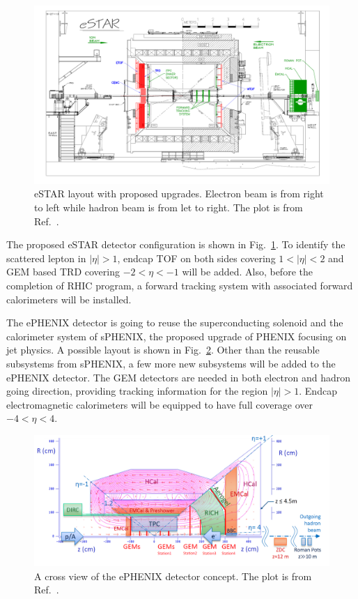 \begin{figure}
\centering
\includegraphics[width=1.0\textwidth]{plots/chpt4/eSTAR_layout.png}
\caption[A layout of the eSTAR detector concept]{
eSTAR layout with proposed upgrades. Electron beam is from right to left while hadron beam is from let to right. The plot is from Ref.~\cite{Abelev:eSTAR}.}
\label{fig:eSTAR_layout}
\end{figure}

The proposed eSTAR detector configuration is shown in
Fig.~\ref{fig:eSTAR_layout}. To identify the scattered lepton in $|\eta|>1$,
endcap TOF on both sides covering $1<|\eta|<2$ and GEM based TRD covering
$-2<\eta<-1$ will be added. Also, before the completion of RHIC program, a
forward tracking system with associated forward calorimeters will be installed.

The ePHENIX detector is going to reuse the superconducting solenoid and the
calorimeter system of sPHENIX, the proposed upgrade of PHENIX focusing on jet
physics. A possible layout is shown in Fig.~\ref{fig:ePhenix_layout}.
Other than the reusable subsystems from sPHENIX, a few more new subsystems will
be added to the ePHENIX detector. The GEM detectors are needed in both electron
and hadron going direction, providing tracking information for the region
$|\eta|>1$. Endcap electromagnetic calorimeters will be equipped to have full
coverage over $-4<\eta<4$.
\begin{figure}
\centering
\includegraphics[width=1.0\textwidth]{plots/chpt4/ePhenix_layout.png}
\caption[A layout of the ePHENIX detector concept]{
A cross view of the ePHENIX detector concept. The plot is from Ref.~\cite{Adare:2014aaa}.}
\label{fig:ePhenix_layout}
\end{figure}

